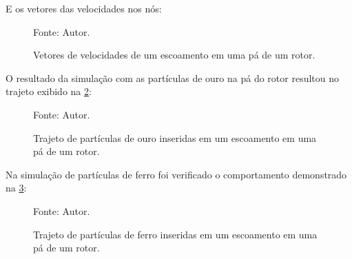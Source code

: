 E os vetores das velocidades nos nós:
\begin{figure}[H]
    \centering
     {\raggedleft \scriptsize Fonte: Autor.}
    \caption{Vetores de velocidades de um escoamento em uma pá de um rotor.}
    \label{rotor_velocity}
\end{figure}

O resultado da simulação com as partículas de ouro na pá do rotor resultou no trajeto exibido na \ref{rotor_trajectory_gold}:
\begin{figure}[H]
    \centering
     {\raggedleft \scriptsize Fonte: Autor.}
    \caption{Trajeto de partículas de ouro inseridas em um escoamento em uma pá de um rotor.}
    \label{rotor_trajectory_gold}
\end{figure}

Na simulação de partículas de ferro foi verificado o comportamento demonstrado na \ref{rotor_trajectory_iron}:
\begin{figure}[H]
    \centering
     {\raggedleft \scriptsize Fonte: Autor.}
    \caption{Trajeto de partículas de ferro inseridas em um escoamento em uma pá de um rotor.}
    \label{rotor_trajectory_iron}
\end{figure}

